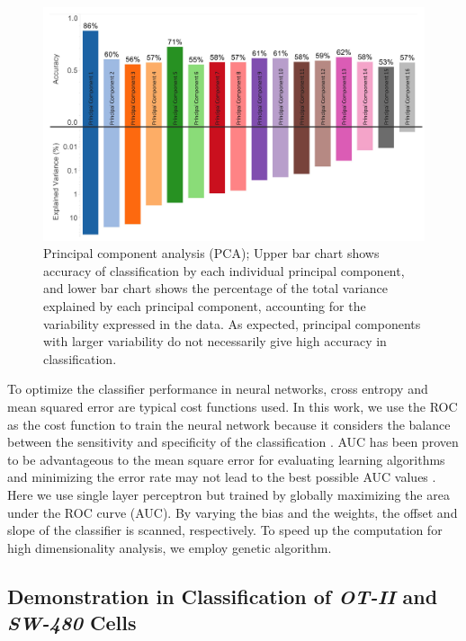 \documentclass[aps,pra,reprint,superscriptaddress]{revtex4-1}
\begin{document}
\begin{figure}
\includegraphics[scale=0.18]{FigurePCA.jpg}
\caption{\label{fig:PCA} Principal component analysis (PCA); Upper bar chart shows accuracy of classification by each individual principal component, and lower bar chart shows the percentage of the total variance explained by each principal component, accounting for the variability expressed in the data. As expected, principal components with larger variability do not necessarily give high accuracy in classification.}
\end{figure}

To optimize the classifier performance in neural networks, cross entropy and mean squared error are typical cost functions used. In this work, we use the ROC as the cost function to train the neural network because it considers the balance between the sensitivity and specificity of the classification \cite{hanley1982meaning}. AUC has been proven to be advantageous to the mean square error for evaluating learning algorithms \cite{verrelst1998use} and minimizing the error rate may not lead to the best possible AUC values \cite{cortes2004auc,huang2005using}. Here we use single layer perceptron but trained by globally maximizing the area under the ROC curve (AUC). By varying the bias and the weights, the offset and slope of the classifier is scanned, respectively. To speed up the computation for high dimensionality analysis, we employ genetic algorithm. 

\subsection{Demonstration in Classification of \textit{OT-II} and \textit{SW-480} Cells}
\end{document}
